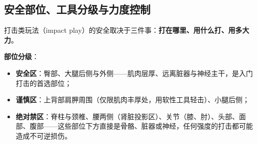\documentclass[12pt,UTF8]{ctexbook}
\begin{document}
\subsection{安全部位、工具分级与力度控制}

打击类玩法（impact play）的安全取决于三件事：\textbf{打在哪里、用什么打、用多大力}。

\noindent\textbf{部位分级}：

\begin{itemize}
\item \textbf{安全区}：臀部、大腿后侧与外侧——肌肉层厚、远离脏器与神经主干，是入门打击的首选部位；
\item \textbf{谨慎区}：上背部肩胛周围（仅限肌肉丰厚处，用软性工具轻击）、小腿后侧；
\item \textbf{绝对禁区}：脊柱与颈椎、腰两侧（肾脏投影区）、关节（膝、肘）、头部、面部、腹部——这些部位下方直接是骨骼、脏器或神经，任何强度的打击都可能造成不可逆损伤。
\end{itemize}
\end{document}
